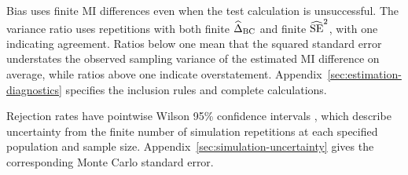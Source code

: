 Bias uses finite MI differences even when the test calculation is
unsuccessful. The variance ratio uses repetitions with both finite
\(\widehat\Delta_{\mathrm{BC}}\) and finite \(\widehat{\operatorname{SE}}^2\), with one indicating agreement. Ratios below
one mean that the squared standard error understates the observed sampling
variance of the estimated MI difference on average, while ratios above one
indicate overstatement.
Appendix~\ref{sec:estimation-diagnostics} specifies the inclusion rules
and complete calculations.

Rejection rates have pointwise Wilson 95\% confidence intervals
\citep{wilson1927}, which describe uncertainty from the finite number of
simulation repetitions at each specified population and sample size.
Appendix~\ref{sec:simulation-uncertainty} gives the corresponding Monte
Carlo standard error.
